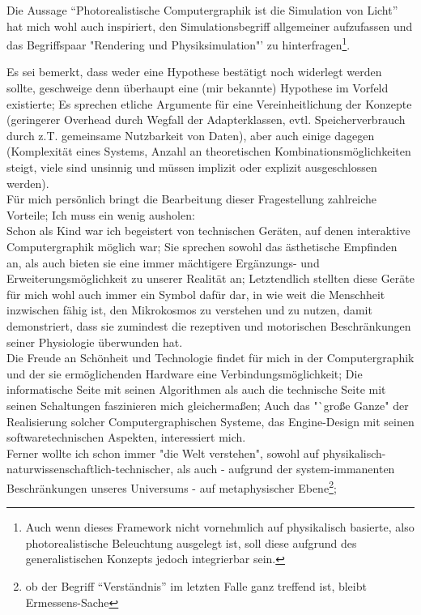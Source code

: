 
Die Aussage "`Photorealistische Computergraphik ist die Simulation von Licht"'  hat mich wohl auch inspiriert, den Simulationsbegriff allgemeiner aufzufassen und das Begriffspaar "Rendering und Physiksimulation"' zu hinterfragen\footnote{Auch wenn dieses Framework nicht vornehmlich auf physikalisch basierte, also photorealistische Beleuchtung ausgelegt ist, soll diese aufgrund des generalistischen Konzepts jedoch integrierbar sein.}.

Es sei bemerkt, dass weder eine Hypothese bestätigt noch widerlegt werden sollte, geschweige denn überhaupt eine (mir bekannte) Hypothese im Vorfeld existierte; Es sprechen etliche Argumente für eine Vereinheitlichung der Konzepte (geringerer Overhead durch Wegfall der Adapterklassen, evtl. Speicherverbrauch durch z.T. gemeinsame Nutzbarkeit von Daten), aber auch einige dagegen (Komplexität eines Systems, Anzahl an theoretischen Kombinationsmöglichkeiten steigt, viele sind unsinnig und müssen implizit oder explizit ausgeschlossen werden).\\

Für mich persönlich bringt die Bearbeitung dieser Fragestellung zahlreiche Vorteile; Ich muss ein wenig ausholen:\\
Schon als Kind war ich begeistert von technischen Geräten, auf denen interaktive Computergraphik möglich war; Sie sprechen sowohl das ästhetische Empfinden an, als auch bieten sie eine immer mächtigere Ergänzungs- und  Erweiterungsmöglichkeit zu unserer Realität an; Letztendlich stellten diese Geräte für mich wohl auch immer ein Symbol dafür dar, in wie weit die Menschheit inzwischen fähig ist, den Mikrokosmos zu verstehen und zu nutzen, damit demonstriert, dass sie zumindest die rezeptiven und motorischen Beschränkungen seiner Physiologie überwunden hat.\\
Die Freude an Schönheit und Technologie findet für mich in der Computergraphik und der sie ermöglichenden Hardware eine Verbindungsmöglichkeit; Die informatische Seite mit seinen Algorithmen als auch die technische Seite mit seinen Schaltungen faszinieren mich gleichermaßen; Auch das "`große Ganze" der Realisierung solcher Computergraphischen Systeme, das Engine-Design mit seinen softwaretechnischen Aspekten, interessiert mich.\\
Ferner wollte ich schon immer "die Welt verstehen", sowohl auf physikalisch-naturwissenschaftlich-technischer, als auch - aufgrund der system-immanenten Beschränkungen unseres Universums - auf metaphysischer Ebene\footnote{ob der Begriff "`Verständnis"' im letzten Falle ganz treffend ist, bleibt Ermessens-Sache};\\

